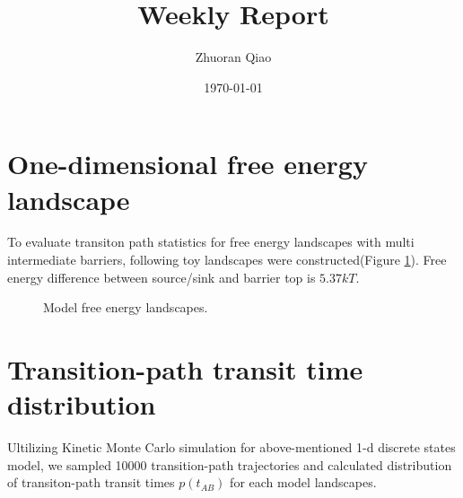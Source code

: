 \documentclass[11pt, a4paper]{article}
\begin{document}
\title{Weekly Report}
\author{Zhuoran Qiao}
\date{\today}

\maketitle
\section{One-dimensional free energy landscape}

To evaluate transiton path statistics for free energy landscapes with multi intermediate barriers,
 following toy landscapes were constructed(Figure \ref{fig:FEL}). Free energy difference between source/sink and barrier top is $5.37kT$.

\begin{figure}[h]
  \noindent{}
  \caption{Model free energy landscapes.}
  \label{fig:FEL}
\end{figure}

\section{Transition-path transit time distribution}

Ultilizing Kinetic Monte Carlo simulation for above-mentioned 1-d discrete states model, we sampled 10000
 transition-path trajectories and calculated distribution of transiton-path transit times $p(t_{AB})$ for each model landscapes.
\end{document}
